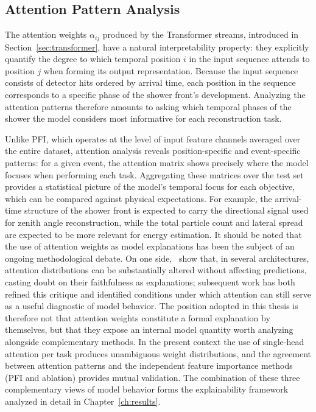 \subsection{Attention Pattern Analysis}

The attention weights $\alpha_{ij}$ produced by the Transformer streams, introduced in Section~\ref{sec:transformer}, have a natural interpretability property: they explicitly quantify the degree to which temporal position $i$ in the input sequence attends to position $j$ when forming its output representation. Because the input sequence consists of detector hits ordered by arrival time, each position in the sequence corresponds to a specific phase of the shower front's development. Analyzing the attention patterns therefore amounts to asking which temporal phases of the shower the model considers most informative for each reconstruction task.

Unlike PFI, which operates at the level of input feature channels averaged over the entire dataset, attention analysis reveals position-specific and event-specific patterns: for a given event, the attention matrix shows precisely where the model focuses when performing each task. Aggregating these matrices over the test set provides a statistical picture of the model's temporal focus for each objective, which can be compared against physical expectations. For example, the arrival-time structure of the shower front is expected to carry the directional signal used for zenith angle reconstruction, while the total particle count and lateral spread are expected to be more relevant for energy estimation. It should be noted that the use of attention weights as model explanations has been the subject of an ongoing methodological debate. On one side,~ show that, in several architectures, attention distributions can be substantially altered without affecting predictions, casting doubt on their faithfulness as explanations; subsequent work has both refined this critique and identified conditions under which attention can still serve as a useful diagnostic of model behavior. The position adopted in this thesis is therefore not that attention weights constitute a formal explanation by themselves, but that they expose an internal model quantity worth analyzing alongside complementary methods. In the present context the use of single-head attention per task produces unambiguous weight distributions, and the agreement between attention patterns and the independent feature importance methods (PFI and ablation) provides mutual validation. The combination of these three complementary views of model behavior forms the explainability framework analyzed in detail in Chapter~\ref{ch:results}.

